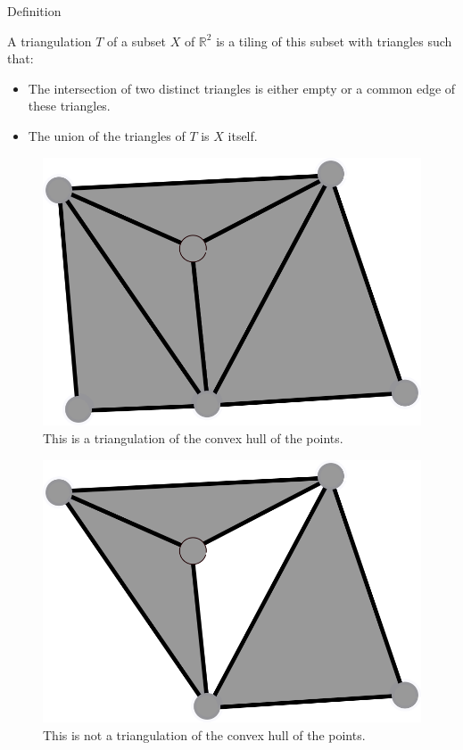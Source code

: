 \documentclass[18pt]{beamer}
\begin{document}
\begin{frame}{Definition}

 A triangulation $T$ of a subset $X$ of $\mathbb{R}^2$ is a tiling of this subset with triangles such
that:
\begin{itemize}
 \item<2-> The intersection of two distinct triangles is either empty or a common edge of these triangles.
 \item<3-> The union of the triangles of $T$ is $X$ itself.
\end{itemize}

\begin{overprint}
\begin{figure}
  \centering
  \includegraphics[scale=1.5]{Trig1}
  \caption{\label{Trig1} This is a triangulation of the convex hull of the points.}
\end{figure}

\begin{figure}
  \centering
  \includegraphics[scale=1.5]{NotTrig1}
  \caption{\label{NotTrig1} This is not a triangulation of the convex hull of the points.}
\end{figure}


\end{overprint}
\end{frame}
\end{document}
